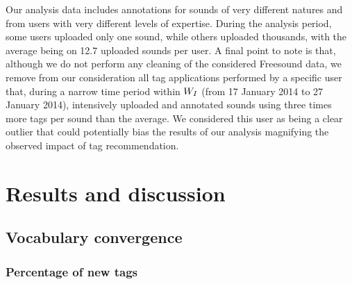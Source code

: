 Our analysis data includes annotations for sounds of very different natures and from users with very different levels of expertise. During the analysis period, some users uploaded only one sound, while others uploaded thousands, with the average being on 12.7 uploaded sounds per user. %
A final point to note is that, although we do not perform any cleaning of the considered Freesound data, we remove from our consideration all tag applications performed by a specific user that, during a narrow time period within $W_I$ (from 17 January 2014 to 27 January 2014), intensively uploaded and annotated sounds using three times more tags per sound than the average. We considered this user as being a clear outlier that could potentially bias the results of our analysis magnifying the observed impact of tag recommendation. %


\section{Results and discussion}
\label{impact:sec:results}


\subsection{Vocabulary convergence}
\label{impact:sec:results_vocabulary_convergence}


\subsubsection{Percentage of new tags}
\label{impact:sec:percentage_of_new_tags_results}

